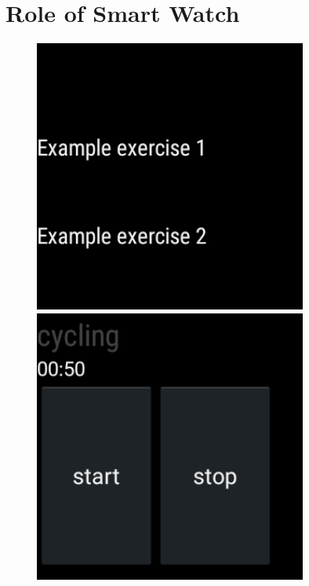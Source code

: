 \section{Role of Smart Watch}

\begin{figure}[c]
  \centering
    \begin{minipage}{0.20\textwidth}
      \centering
        \includegraphics[width=0.80\textwidth]{00_resources/figures/Android_Watch_ListView.png}
    \end{minipage}
    \begin{minipage}{0.20\textwidth}
      \centering
        \includegraphics[width=0.80\textwidth]{00_resources/figures/Android_Watch_RecordView.png}

\end{minipage}
\end{figure}
